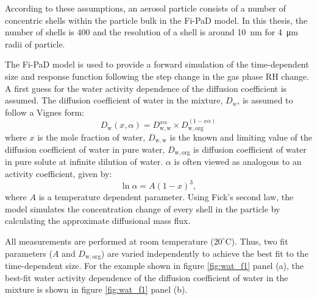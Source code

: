 According to these assumptions, an aerosol particle consists of a number of concentric shells within the particle bulk in the Fi-PaD model. In this thesis, the number of shells is \num{400} and the resolution of a shell is around \SI{10}{\nano\meter} for \SI{4}{\micro\meter} radii of particle. 

The Fi-PaD model is used to provide a forward simulation of the time-dependent size and response function following the step change in the gas phase RH change. \cite{omearaRateEquilibrationViscous2016}\cite{Ingram2017} A first guess for the water activity dependence of the diffusion coefficient is assumed. The diffusion coefficient of water in the mixture, $D_{w}$, is assumed to follow a Vignes form:\cite{omearaRateEquilibrationViscous2016}\cite{Ingram2017} 
\begin{equation}\label{eqn:vignes_form}
D_{\mathrm{w}}(x, \alpha)=D_{\mathrm{w, w}}^{x \alpha} \times D_{\mathrm{w}, \mathrm{org}}^{(1-x \alpha)}
\end{equation}
where $x$ is the mole fraction of water, $D_{\mathrm{w, w}}$ is the known and limiting value of the diffusion coefficient of water in pure water, $D_{\mathrm{w}, \mathrm{org}}$ is diffusion coefficient of water in pure solute at infinite dilution of water. $\alpha$ is often viewed as analogous to an activity coefficient, given by:
\begin{equation}
\ln \alpha=A(1-x)^{3},
\end{equation}
where $A$ is a temperature dependent parameter. Using Fick’s second law, the model simulates the concentration change of every shell in the particle by calculating the approximate diffusional mass flux.  

All measurements are performed at room temperature ($\num{20}^{\circ}\mathrm{C}$). Thus, two fit parameters ($A$ and $D_{\mathrm{w,org}}$) are varied independently to achieve the best fit to the time-dependent size. For the example shown in figure \ref{fig:wat_f1} panel (a), the best-fit water activity dependence of the diffusion coefficient of water in the mixture is shown in figure \ref{fig:wat_f1} panel (b). 

